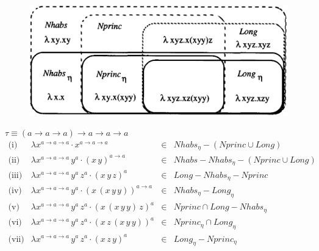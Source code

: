 \begin{frame}

\begin{figure}[h]
   \centering
   \includegraphics[scale=0.3]{fig2.png}
\end{figure}

\begin{center}
$\tau \equiv (a\to a\to a)\to a \to a \to a$\\[0.5cm]

$
\begin{array}{rlcl}
\mbox{(i)} & \lambda x^{a\to a \to a} \cdot x^{a\to a \to a} & \in & Nhabs_{\eta} - (Nprinc \cup Long)\\ 
\mbox{(ii)} & \lambda x^{a\to a \to a} \, y^{a} \cdot (x\,y)^{a \to a}& \in & Nhabs - Nhabs_{\eta} - (Nprinc \cup Long)\\ 
\mbox{(iii)} & \lambda x^{a\to a \to a} \, y^{a} \, z^{a} \cdot (x\,y\,z)^{a}& \in & Long - Nhabs_{\eta} - Nprinc\\
\mbox{(iv)} & \lambda x^{a\to a \to a} \, y^{a} \cdot (x\,(x\,y\,y))^{a \to a}& \in & Nhabs_{\eta} - Long_{\eta} \\ 
\mbox{(v)} & \lambda x^{a\to a \to a} \, y^{a} \, z^{a} \cdot (x\,(x\,y\,y)\,z)^{a}& \in & Nprinc \cap Long - Nhabs_{\eta} \\ 
\mbox{(vi)} & \lambda x^{a\to a \to a} \, y^{a} \, z^{a} \cdot (x\,z\,(x\,y\,y))^{a}& \in & Nprinc_{\eta} \cap  Long_{\eta}\\ 
\mbox{(vii)} & \lambda x^{a\to a \to a} \, y^{a} \, z^{a} \cdot (x\,z\,y)^{a}& \in &  Long_{\eta} - Nprinc_{\eta}\\ 
\end{array}
$
\end{center}

 
\end{frame}

